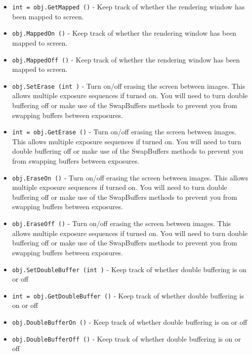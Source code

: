 \begin{itemize}
\item  \verb|int = obj.GetMapped ()| -  Keep track of whether the rendering window has been mapped to screen.

\item  \verb|obj.MappedOn ()| -  Keep track of whether the rendering window has been mapped to screen.

\item  \verb|obj.MappedOff ()| -  Keep track of whether the rendering window has been mapped to screen.

\item  \verb|obj.SetErase (int )| -  Turn on/off erasing the screen between images. This allows multiple 
 exposure sequences if turned on. You will need to turn double 
 buffering off or make use of the SwapBuffers methods to prevent
 you from swapping buffers between exposures.

\item  \verb|int = obj.GetErase ()| -  Turn on/off erasing the screen between images. This allows multiple 
 exposure sequences if turned on. You will need to turn double 
 buffering off or make use of the SwapBuffers methods to prevent
 you from swapping buffers between exposures.

\item  \verb|obj.EraseOn ()| -  Turn on/off erasing the screen between images. This allows multiple 
 exposure sequences if turned on. You will need to turn double 
 buffering off or make use of the SwapBuffers methods to prevent
 you from swapping buffers between exposures.

\item  \verb|obj.EraseOff ()| -  Turn on/off erasing the screen between images. This allows multiple 
 exposure sequences if turned on. You will need to turn double 
 buffering off or make use of the SwapBuffers methods to prevent
 you from swapping buffers between exposures.

\item  \verb|obj.SetDoubleBuffer (int )| -  Keep track of whether double buffering is on or off

\item  \verb|int = obj.GetDoubleBuffer ()| -  Keep track of whether double buffering is on or off

\item  \verb|obj.DoubleBufferOn ()| -  Keep track of whether double buffering is on or off

\item  \verb|obj.DoubleBufferOff ()| -  Keep track of whether double buffering is on or off


\end{itemize}
